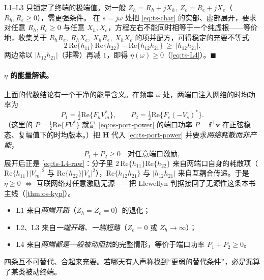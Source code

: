 \begin{derivation}
L1--L3 只锁定了终端的极端值。对一般 $Z_h=R_h+jX_h,\ Z_e=R_e+jX_e$（$R_h,R_e\ge0$），需更强条件。
在 $s=j\omega$ 处把 \cref{eq:ts-char} 的实部、虚部展开，要求对任意 $R_h,R_e\ge0$ 与任意 $X_h,X_e$，方程左右不能同时相等于一个纯虚根——等价地，收集关于 $R_hR_e,\ R_hX_e,\ X_hR_e,\ X_hX_e$ 的项并配方，可得稳定的充要不等式
\begin{equation}
  2\,\mathrm{Re}\{h_{11}\}\,\mathrm{Re}\{h_{22}\}-\mathrm{Re}\{h_{12}h_{21}\}\ \ge\ |h_{12}h_{21}|.
  \label{eq:ts-L4-raw}
\end{equation}
两边除以 $|h_{12}h_{21}|$（非零）再减 $1$，即得 $\eta(\omega)\ge0$（\cref{eq:ts-L4}）。\hfill$\blacksquare$
\end{derivation}

\paragraph{$\eta$ 的能量解读。}
上面的代数结论有一个干净的能量含义。在频率 $\omega$ 处，两端口注入网络的时均功率为
\begin{equation}
  P_1=\tfrac12\mathrm{Re}\{F_h V_m^*\},\qquad P_2=\tfrac12\mathrm{Re}\{F_e(-V_s)^*\}.
  \label{eq:ts-port-power}
\end{equation}
（这里的 $P=\tfrac12\mathrm{Re}\{F V^*\}$ 就是 \cref{eq:os-port-power} 的端口功率 $P=\mathbf f^\top\mathbf v$ 在正弦稳态、复幅值下的时均版本。）把 $\mathbf H$ 代入 \cref{eq:ts-port-power} 并要求\emph{网络耗散而非产能}，
\begin{equation}
  P_1+P_2\ge0\quad\text{对任意端口激励},
  \label{eq:ts-passive-sum}
\end{equation}
展开后正是 \cref{eq:ts-L4-raw}：分子里 $2\,\mathrm{Re}\{h_{11}\}\mathrm{Re}\{h_{22}\}$ 来自两端口自身的耗散项（$\mathrm{Re}\{h_{11}\}|V_m|^2$ 与 $\mathrm{Re}\{h_{22}\}|V_s|^2$），$\mathrm{Re}\{h_{12}h_{21}\}$ 与 $|h_{12}h_{21}|$ 来自互耦合传递。于是 $\eta\ge0$ $\iff$ 互联网络对任意激励无源——把 Llewellyn 判据接回了无源性这条本书主线（\cref{thm:os-kyp}）。

\begin{insight}[四判据各来自哪种终端]
\begin{itemize}
  \item L1 来自\emph{两端开路}（$Z_h=Z_e=0$）的退化；
  \item L2、L3 来自\emph{一端开路、一端短路}（$Z_e=0$ 或 $Z_h\to\infty$）；
  \item L4 来自\emph{两端都是一般被动阻抗}的完整情形，等价于端口功率 $P_1+P_2\ge0$。
\end{itemize}
四条互不可替代、合起来充要。若哪天有人声称找到“更弱的替代条件”，必是漏算了某类被动终端。
\end{insight}

